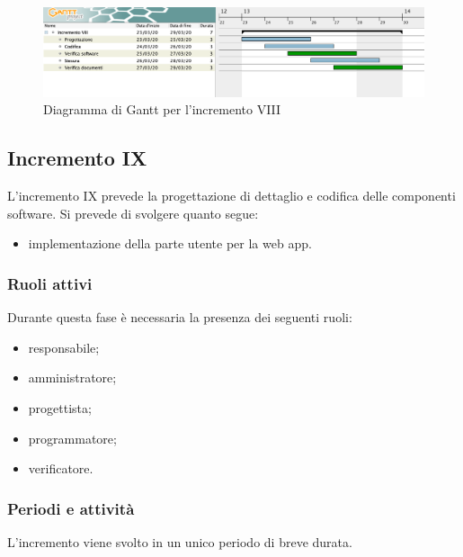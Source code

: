 		\begin{landscape}
          \begin{figure}[H]
            \centering
            \includegraphics[width=\linewidth]{images/gantt/incrementoVIII} %
            \caption{Diagramma di Gantt per l'incremento VIII}
          \end{figure}		
		\end{landscape}


		\subsection{Incremento IX}
			
			L'incremento IX prevede la progettazione di dettaglio e codifica delle componenti software. Si prevede di svolgere quanto segue:
			\begin{itemize}
				\item implementazione della parte utente per la web app.
			\end{itemize}
			
			\subsubsection{Ruoli attivi}
			
				Durante questa fase è necessaria la presenza dei seguenti ruoli:
				\begin{itemize}
					\item responsabile;
					\item amministratore;
					\item progettista;
					\item programmatore;
					\item verificatore.
				\end{itemize}
			
			\subsubsection{Periodi e attività}
			
				L'incremento viene svolto in un unico periodo di breve durata.
				
